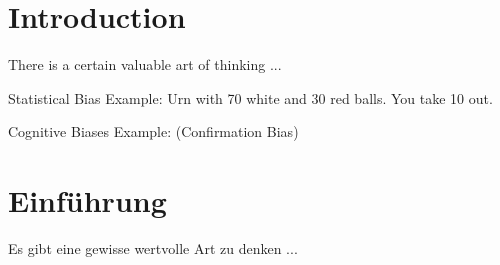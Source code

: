 \ifEnglish

\section{Introduction}


\begin{frame}[standout]
    There is a certain valuable art of thinking ...
\end{frame}



\begin{frame}[c]{Statistical Bias}
    Example: Urn with 70 white and 30 red balls. \newline
    \newline \pause
    You take 10 out.
\end{frame}

\begin{frame}[c]{Cognitive Biases}
    Example:\pause 
    \newline \pause
    (Confirmation Bias)
\end{frame}

\else

\section{Einführung}

\begin{frame}[standout]
    Es gibt eine gewisse wertvolle Art zu denken ...
\end{frame}


